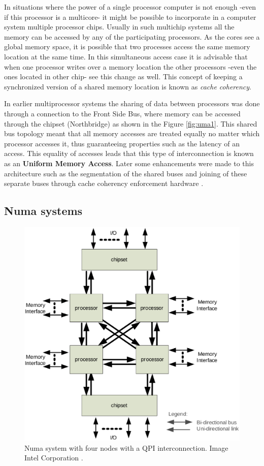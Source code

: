 In situations where the power of a single processor computer is not enough -even if this processor is a multicore- it might be possible to incorporate in a computer system multiple processor chips. Usually in such multichip systems all the memory can be accessed by any of the participating processors. As the cores see a global memory space, it is possible that two processes access the same memory location at the same time. In this simultaneous access case it is advisable that when one processor writes over a memory location the other processors -even the ones located in other chip- see this change as well. This concept of keeping a synchronized version of a shared memory location is known as \textit{cache coherency}. 

In earlier multiprocessor systems the sharing of data between processors was done through a connection to the Front Side Bus, where memory can be accessed through the chipset (Northbridge) as shown in the Figure \ref{fig:uma1}. This shared bus topology meant that all memory accesses are treated equally no matter which processor accesses it, thus guaranteeing properties such as the latency of an access. This equality of accesses leads that this type of interconnection is known as an \textbf{Uniform Memory Access}. Later some enhancements were made to this architecture such as the segmentation of the shared buses and joining of these separate buses through cache coherency enforcement hardware \cite{qpi-intel}.

\subsection{Numa systems}\label{subsection:numa}

\begin{figure}[ht]
	\centering
		\includegraphics[width=.6\textwidth]{figures/numa-qpi.eps}
		\caption[Basic NUMA System]{Numa system with four nodes with a QPI interconnection. Image Intel Corporation \cite{qpi-intel}. }
		\label{fig:numa1}
\end{figure}

